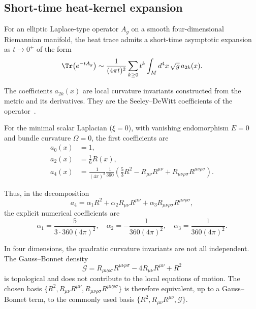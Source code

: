 \subsection{Short-time heat-kernel expansion}
  \label{subsec:hk-expansion}

  For an elliptic Laplace-type operator $A_g$ on a smooth four-dimensional
  Riemannian manifold, the heat trace admits a short-time asymptotic expansion
  as $t \to 0^+$ of the form
  \begin{equation}
    \Tr\!\left(e^{-tA_g}\right)
    \sim
    \frac{1}{(4\pi t)^2}
    \sum_{k\ge 0}
    t^{k}
    \int_M d^4x\,\sqrt{g}\, a_{2k}(x) .
  \end{equation}

  The coefficients $a_{2k}(x)$ are local curvature invariants constructed from
  the metric and its derivatives.
  They are the Seeley--DeWitt coefficients of the operator~\cite{Seeley1967,DeWitt1965,Vassilevich2003}.

  For the minimal scalar Laplacian ($\xi=0$), with vanishing endomorphism
  $E=0$ and bundle curvature $\Omega=0$, the first coefficients are
  \begin{align}
    a_0(x) &= 1 , \\
    a_2(x) &= \frac{1}{6} R(x) , \\
    a_4(x)
    &=
    \frac{1}{(4\pi)^2}
    \frac{1}{360}
    \left(
      \frac{5}{3} R^2
    -
    R_{\mu\nu} R^{\mu\nu}
      +
      R_{\mu\nu\rho\sigma} R^{\mu\nu\rho\sigma}
    \right) .
  \end{align}

  Thus, in the decomposition
  \begin{equation}
    a_4
    =
    \alpha_1 R^2
    +
    \alpha_2 R_{\mu\nu} R^{\mu\nu}
    +
    \alpha_3 R_{\mu\nu\rho\sigma} R^{\mu\nu\rho\sigma},
  \end{equation}
  the explicit numerical coefficients are
  \begin{equation}
    \alpha_1
    =
    \frac{5}{3 \cdot 360 (4\pi)^2},
    \quad
    \alpha_2
    =
    -\frac{1}{360 (4\pi)^2},
    \quad
    \alpha_3
    =
    \frac{1}{360 (4\pi)^2}.
  \end{equation}

  In four dimensions, the quadratic curvature invariants are not all
  independent.
  The Gauss--Bonnet density
  \begin{equation}
    \mathcal{G}
    =
    R_{\mu\nu\rho\sigma} R^{\mu\nu\rho\sigma}
    -
    4 R_{\mu\nu} R^{\mu\nu}
    +
    R^2
  \end{equation}
  is topological and does not contribute to the local equations of motion.
  The chosen basis $\{R^2, R_{\mu\nu}R^{\mu\nu},
R_{\mu\nu\rho\sigma}R^{\mu\nu\rho\sigma}\}$ is therefore equivalent,
  up to a Gauss--Bonnet term, to the commonly used basis
  $\{R^2, R_{\mu\nu}R^{\mu\nu}, \mathcal{G}\}$.
